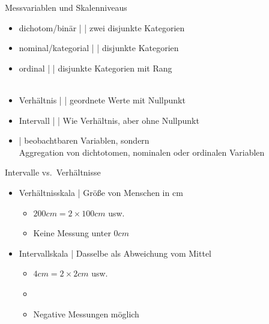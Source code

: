 \begin{frame}
  {Messvariablen und Skalenniveaus}
  \begin{itemize}[<+->]
    \item \alert{dichotom\slash binär} |  | zwei disjunkte Kategorien\\
      \Viertelzeile
    \item \alert{nominal\slash kategorial} |  | disjunkte Kategorien\\
      \Viertelzeile
    \item \alert{ordinal} |  | disjunkte Kategorien mit Rang\\
      \\
      \Viertelzeile
    \item \alert{Verhältnis} |  | geordnete Werte mit Nullpunkt\\
      \Viertelzeile
    \item \alert{Intervall} |  | Wie Verhältnis, aber ohne Nullpunkt\\
      \Zeile
    \item {} |  beobachtbaren Variablen, sondern\\
      Aggregation von dichtotomen, nominalen oder ordinalen Variablen\\
  \end{itemize}
\end{frame}

\begin{frame}
  {Intervalle vs.\ Verhältnisse}
  \begin{itemize}[<+->]
    \item \alert{Verhältnisskala} | Größe von Menschen in cm
      \begin{itemize}[<+->]
	\item $200 cm = 2 \times 100 cm$ usw.
	\item Keine Messung unter $0 cm$ 
      \end{itemize}
      \Zeile
    \item \alert{Intervallskala} | Dasselbe als \alert{Abweichung vom Mittel}
      \begin{itemize}[<+->]
	\item $4 cm = 2 \times 2 cm$ usw.
        \item \orongsch{$184 cm \neq 2 \times 182 cm$}
	\item Negative Messungen möglich
      \end{itemize}
  \end{itemize}
\end{frame}

